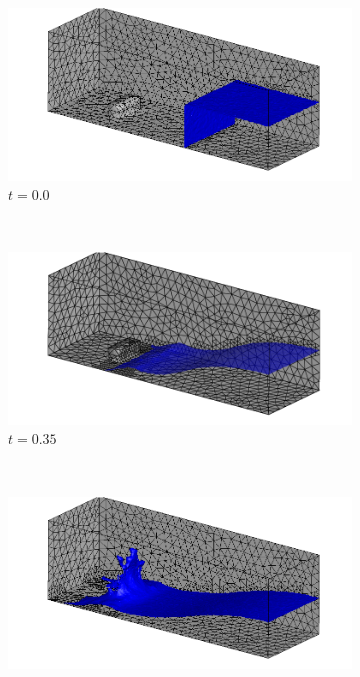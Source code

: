\documentclass[11pt,a4paper,twoside]{article}
\begin{document}
	
	\begin{figure}[ht!]
		\begin{center}
			\begin{subfigure}[]{0.3\textwidth}
				\includegraphics[width=\textwidth]{3D_Dam_t0.png}
				\caption{$ t=0.0 $}
			\end{subfigure}
			~
			\begin{subfigure}[]{0.3\textwidth}
				\includegraphics[width=\textwidth]{3D_Dam_t0_44.png}
				\caption{$ t=0.35 $}
			\end{subfigure}
			~
			\begin{subfigure}[]{0.3\textwidth}
				\includegraphics[width=\textwidth]{3D_Dam_t0_62.png}

\end{subfigure}
\end{center}
\end{figure}
\end{document}
